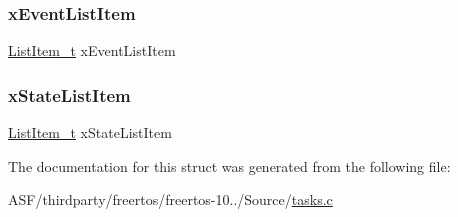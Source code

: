 \subsubsection{\texorpdfstring{xEventListItem}{xEventListItem}}
{\footnotesize\ttfamily \mbox{\hyperlink{list_8h_a1a62d469392f9bfe2443e7efab9c8398}{List\+Item\+\_\+t}} x\+Event\+List\+Item}

\mbox{\label{structtsk_task_control_block_a2575f6a579ef61db0db66d7b1b52ec48}} 
\subsubsection{\texorpdfstring{xStateListItem}{xStateListItem}}
{\footnotesize\ttfamily \mbox{\hyperlink{list_8h_a1a62d469392f9bfe2443e7efab9c8398}{List\+Item\+\_\+t}} x\+State\+List\+Item}



The documentation for this struct was generated from the following file\+:\begin{DoxyCompactItemize}
\item 
A\+S\+F/thirdparty/freertos/freertos-\/10../\+Source/\mbox{\hyperlink{tasks_8c}{tasks.\+c}}\end{DoxyCompactItemize}
